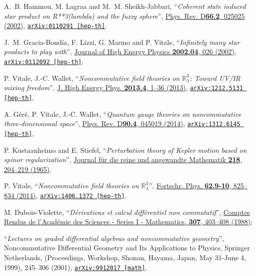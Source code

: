 \documentclass[a4paper,11pt,twoside]{article}
\numberwithin{equation}{section}
\newcommand{\arxiv}[3]{\href{#3}{\texttt{arXiv:#1 [#2]}}}
\theoremstyle{nonumberplain}
\newcounter{and}
\begin{document}
\begin{thebibliography}{88}
% 
A.~B. Hammou, M. Lagraa and M.~M. Sheikh-Jabbari, %
``\emph{Coherent state induced star product on R**3(lambda) and the fuzzy sphere}'', %
\href{http://dx.doi.org/10.1103/PhysRevD.66.025025}{Phys. Rev. D\textbf{66.2}, 025025 (2002)}, %
\href{http://arxiv.org/abs/hep-th/0110291}{\texttt{arXiv:0110291 [hep-th]}}.%

%
J.~M. Gracia-Bond\'ia, F. Lizzi, G. Marmo and P. Vitale, %
``\emph{Infinitely many star products to play with}'', %
\href{http://dx.doi.org/1126-6708/2002/04/026/}{Journal of High Energy Physics \textbf{2002.04}, 026 (2002)}, %
\arxiv{0112092}{hep-th}{http://arxiv.org/abs/hep-th/0112092}.%

% 
P. Vitale, J.-C. Wallet, %
``\emph{Noncommutative field theories on $\mathbb{R}^3_\lambda$: Toward UV/IR mixing freedom}'', %
\href{http://dx.doi.org/10.1007/JHEP04(2013)115}{J. High Energy Phys. \textbf{2013.4}, 1--36 (2013)}, %
\arxiv{1212.5131}{hep-th}{http://arxiv.org/abs/1212.5131}.%

% 
A. G\'er\'e, P. Vitale, J.-C. Wallet,%
``\emph{Quantum gauge theories on noncommutative three-dimensional space}'', %
\href{http://dx.doi.org/10.1103/PhysRevD.90.045019}{Phys. Rev. D\textbf{90.4}, 045019 (2014)}, %
\arxiv{1312.6145}{hep-th}{http://arxiv.org/abs/1312.6145}.%

%
P. Kustaanheimo and E. Stiefel, %
``\emph{Perturbation theory of Kepler motion based on spinor regularization}'', %
\href{http://gdz.sub.uni-goettingen.de/dms/resolveppn/?PPN=GDZPPN00218124X}{Journal f\"ur die reine und angewandte Mathematik \textbf{218}, 204--219 (1965)}.%

% 
P. Vitale, %
``\emph{Noncommutative field theories on $\mathbb{R}^3_\lambda$}'', %
\href{http://dx.doi.org/10.1002/prop.201400037}{Fortschr. Phys. \textbf{62.9‐10}, 825--834 (2014)}, %
\arxiv{1406.1372}{hep-th}{http://arxiv.org/abs/1406.1372}.%

%
M. Dubois-Violette, %
``\emph{Dérivations et calcul différentiel non commutatif}'', %
\href{http://patriciadv.free.fr/MDV/Publications_files/88-19.pdf}{Comptes Rendus de l'Académie des Sciences - Series I - Mathematics, \textbf{307}, 403--408 (1988)};\par%
``\emph{Lectures on graded differential algebras and noncommutative geometry}'', %
Noncommutative Differential Geometry and Its Applications to Physics, Springer Netherlands, (Proceedings, Workshop, Shonan, Hayama, Japan, May 31-June 4, 1999), 245--306 (2001), %
\arxiv{9912017}{math}{http://arxiv.org/abs/math/9912017}.%


\end{thebibliography}
\end{document}

